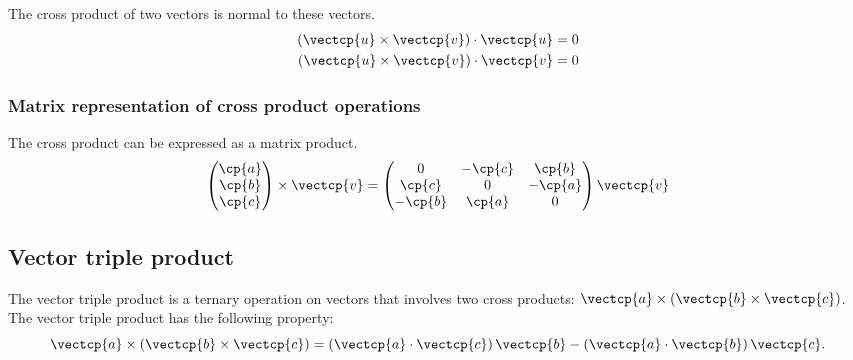     The cross product of two vectors is normal to these vectors.
\begin{subequations}
    \begin{align}
        (\vectcp{u} \times \vectcp{v}) \cdot \vectcp{u} &= 0
        \\
        (\vectcp{u} \times \vectcp{v}) \cdot \vectcp{v} &= 0
    \end{align}
\end{subequations}

\subsubsection{Matrix representation of cross product operations}
The cross product can be expressed as a matrix product.
\begin{equation}
    \begin{pmatrix}
        \cp{a} \\ \cp{b} \\ \cp{c}
    \end{pmatrix}
    \times
    \vectcp{v}
    =
    \begin{pmatrix}
        0 & -\cp{c} & \cp{b} \\
        \cp{c} & 0 & -\cp{a} \\
        -\cp{b} & \cp{a} & 0
    \end{pmatrix}
    \vectcp{v}
    \label{eq:cross_product_matrix}
\end{equation}





\subsection{Vector triple product}

The vector triple product is a ternary operation on vectors that involves two cross products: $\vectcp{a} \times (\vectcp{b} \times \vectcp{c})$.
The vector triple product has the following property:
\begin{equation}
    \vectcp{a} \times \left(\vectcp{b} \times \vectcp{c}\right)
    =
    \left(\vectcp{a} \cdot \vectcp{c}\right) \vectcp{b}
    -
    \left(\vectcp{a} \cdot \vectcp{b}\right) \vectcp{c}
    \text{.}
    \label{eq:vector_triple_product}
\end{equation}

